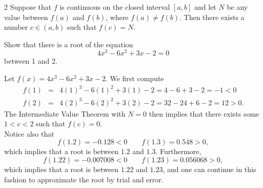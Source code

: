 \documentclass{book}
\begin{document}
\begin{Thm}
\begin{multicols}{2}
 Suppose that $f$ is continuous on the closed interval $[a,b]$ and let $N$ be any value between $f(a)$ and $f(b)$, where $f(a)\neq f(b)$. Then there exists a number $c \in (a,b)$ such that $f(c) = N$.
\begin{center}
\end{center}
\end{multicols}\end{Thm}\vs



\begin{Exam} Show that there is a root of the equation \[4x^3-6x^2+3x-2 = 0\] between 1 and 2.
\begin{pf}
Let $f(x) = 4x^3-6x^2+3x-2 $. We first compute
\begin{eqnarray*}
f(1) &=& 4(1)^3-6(1)^2+3(1)-2 = 4-6+3-2 = -1 < 0\\
f(2) &=& 4(2)^3-6(2)^2+3(2)-2 = 32-24+6-2 = 12 > 0.
\end{eqnarray*} The Intermediate Value Theorem with $N= 0$ then implies that there exists some $1 < c < 2$ such that $f(c) = 0$. \\

Notice also that 
\[f(1.2) = -0.128 < 0\qquad f(1.3) = 0.548 > 0,\] which implies that  a root is between $1.2$ and $1.3$. Furthermore, \[f(1.22) = -0.007008 < 0\qquad f(1.23) = 0.056068 > 0,\] which implies that  a root is between $1.22$ and $1.23$, and one can continue in this fashion to approximate the root by trial and error. 
\end{pf}
\end{Exam}\vs
\end{document}
